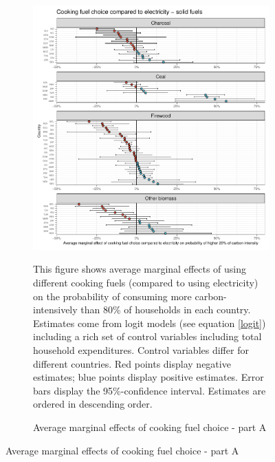  \begin{figure}[ht!]\ContinuedFloat
   \centering
   \begin{subfigure}[b]{\textwidth}
   \centering
   \includegraphics{1_Figures/Analysis_Logit_Models_Marginal_Effects/Average_Marginal_Effects_affected_upper_80_CF_Electricity A_2017B.pdf}
   \caption{Average marginal effects of cooking fuel choice - part A} \label{fig:Logit_ME_CF_1}
   \begin{subcaption2}
     This figure shows average marginal effects of using different cooking fuels (compared to using electricity) on the probability of consuming more carbon-intensively than 80\% of households in each country. Estimates come from logit models (see equation \ref{logit}) including a rich set of control variables including total household expenditures. Control variables differ for different countries. Red points display negative estimates; blue points display positive estimates. Error bars display the 95\%-confidence interval. Estimates are ordered in descending order.
   \end{subcaption2}
   \end{subfigure}
 \end{figure}
 \clearpage

